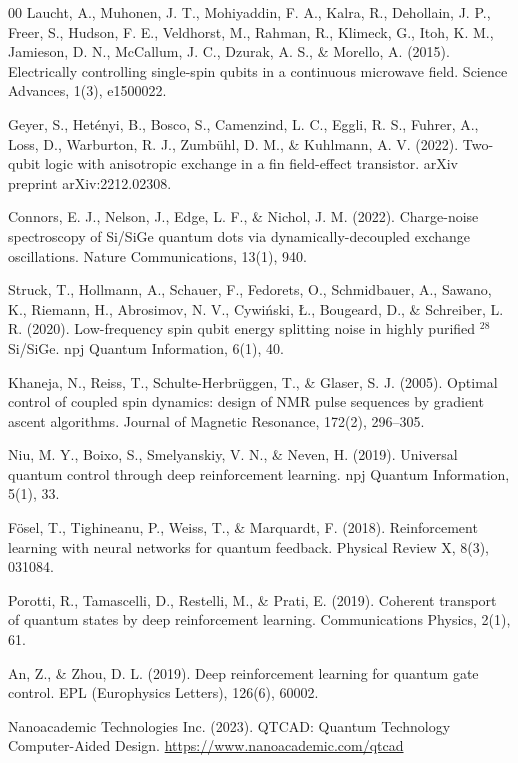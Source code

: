 \documentclass[preprint,12pt, a4paper]{elsarticle}
\begin{document}
\begin{thebibliography}{00}
 Laucht, A., Muhonen, J. T., Mohiyaddin, F. A., Kalra, R., Dehollain, J. P., Freer, S., Hudson, F. E., Veldhorst, M., Rahman, R., Klimeck, G., Itoh, K. M., Jamieson, D. N., McCallum, J. C., Dzurak, A. S., \& Morello, A. (2015). Electrically controlling single-spin qubits in a continuous microwave field. Science Advances, 1(3), e1500022.

 Geyer, S., Het\'{e}nyi, B., Bosco, S., Camenzind, L. C., Eggli, R. S., Fuhrer, A., Loss, D., Warburton, R. J., Zumb\"{u}hl, D. M., \& Kuhlmann, A. V. (2022). Two-qubit logic with anisotropic exchange in a fin field-effect transistor. arXiv preprint arXiv:2212.02308.

 Connors, E. J., Nelson, J., Edge, L. F., \& Nichol, J. M. (2022). Charge-noise spectroscopy of Si/SiGe quantum dots via dynamically-decoupled exchange oscillations. Nature Communications, 13(1), 940.

 Struck, T., Hollmann, A., Schauer, F., Fedorets, O., Schmidbauer, A., Sawano, K., Riemann, H., Abrosimov, N. V., Cywi\'{n}ski, {\L}., Bougeard, D., \& Schreiber, L. R. (2020). Low-frequency spin qubit energy splitting noise in highly purified $^{28}$Si/SiGe. npj Quantum Information, 6(1), 40.

 Khaneja, N., Reiss, T., Schulte-Herbr\"{u}ggen, T., \& Glaser, S. J. (2005). Optimal control of coupled spin dynamics: design of NMR pulse sequences by gradient ascent algorithms. Journal of Magnetic Resonance, 172(2), 296--305.

 Niu, M. Y., Boixo, S., Smelyanskiy, V. N., \& Neven, H. (2019). Universal quantum control through deep reinforcement learning. npj Quantum Information, 5(1), 33.

 F\"{o}sel, T., Tighineanu, P., Weiss, T., \& Marquardt, F. (2018). Reinforcement learning with neural networks for quantum feedback. Physical Review X, 8(3), 031084.

 Porotti, R., Tamascelli, D., Restelli, M., \& Prati, E. (2019). Coherent transport of quantum states by deep reinforcement learning. Communications Physics, 2(1), 61.

 An, Z., \& Zhou, D. L. (2019). Deep reinforcement learning for quantum gate control. EPL (Europhysics Letters), 126(6), 60002.

 Nanoacademic Technologies Inc. (2023). QTCAD: Quantum Technology Computer-Aided Design. \url{https://www.nanoacademic.com/qtcad}


\end{thebibliography}
\end{document}
